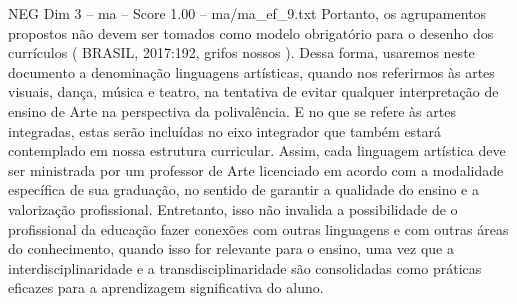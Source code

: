 \begin{textsample}{NEG Dim 3 – ma – Score 1.00 – ma/ma\_ef\_9.txt}
Portanto, os agrupamentos propostos não devem ser tomados como modelo obrigatório para o desenho dos currículos ( BRASIL, 2017:192, grifos nossos ).
Dessa forma, usaremos neste documento a denominação linguagens artísticas, quando nos referirmos às artes visuais, dança, música e teatro, na tentativa de evitar qualquer interpretação de ensino de Arte na perspectiva da polivalência.
E no que se refere às artes integradas, estas serão incluídas no eixo integrador que também estará contemplado em nossa estrutura curricular.
Assim, cada linguagem artística deve ser ministrada por um professor de Arte licenciado em acordo com a modalidade específica de sua graduação, no sentido de garantir a qualidade do ensino e a valorização profissional.
Entretanto, isso não invalida a possibilidade de o profissional da educação fazer conexões com outras linguagens e com outras áreas do conhecimento, quando isso for relevante para o ensino, uma vez que a interdisciplinaridade e a transdisciplinaridade são consolidadas como práticas eficazes para a aprendizagem significativa do aluno.

\end{textsample}
